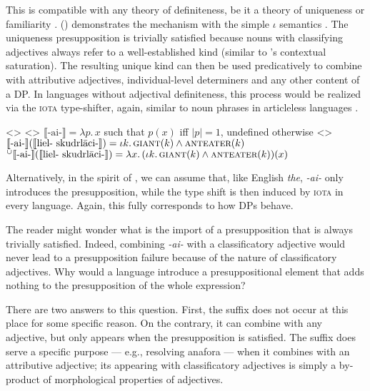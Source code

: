 \documentclass[a4paper, 12pt]{article}
\begin{document}
This is compatible with any theory of definiteness, be it a theory of uniqueness \parencite{russell1905denoting,strawson1950referring} or familiarity \parencite{heim1982semanticsdefiniteindefinite}. (\nextx) demonstrates the mechanism with the simple $\iota$ semantics \parencite{partee1986nounphraseinterpretation}. The uniqueness presupposition is trivially satisfied because nouns with classifying adjectives always refer to a well-established kind (similar to 's contextual saturation). The resulting unique kind can then be used predicatively to combine with attributive adjectives, individual-level determiners and any other content of a DP. In languages without adjectival definiteness, this process would be realized via the \textsc{iota} type-shifter, again, similar to noun phrases in articleless languages \parencite{dayal2004numbermarkingdefiniteness}.

\pex<>
\a<> $\llbracket \text{-ai-} \rrbracket = \lambda p.\,x$ such that $p(x)$ iff $|p|=1$, undefined otherwise
\a<> $\llbracket \text{-ai-} \rrbracket (\llbracket  \text{liel- skudrlāci-}\rrbracket ) =  \iota k.\,\textsc{giant}(k) \land \textsc{anteater}(k)$
\a $^\cup \llbracket \text{-ai-} \rrbracket(\llbracket \text{liel- skudrlāci-} \rrbracket) = \lambda x.\, (\iota k.\,\textsc{giant}(k) \land \textsc{anteater}(k))(x)$
\xe

Alternatively, in the spirit of \parencite{coppock2015definitenessdeterminacy}, we can assume that, like English \textit{the}, \textit{-ai-} only introduces the presupposition, while the type shift is then induced by \textsc{iota} in every language. Again, this fully corresponds to how DPs behave.

The reader might wonder what is the import of a presupposition that is always trivially satisfied. Indeed, combining \textit{-ai-} with a classificatory adjective would never lead to a presupposition failure because of the nature of classificatory adjectives. Why would a language introduce a presuppositional element that adds nothing to the presupposition of the whole expression?

There are two answers to this question. First, the suffix does not occur at this place for some specific reason. On the contrary, it can combine with any adjective, but only appears when the presupposition is satisfied. The suffix does serve a specific purpose --- e.g., resolving anafora --- when it combines with an attributive adjective; its appearing with classificatory adjectives is simply a by-product of morphological properties of adjectives.
\end{document}
